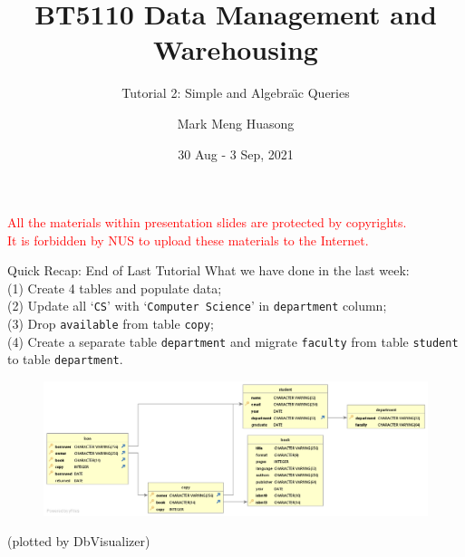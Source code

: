 \title{BT5110 Data Management and Warehousing}

\subtitle{Tutorial 2: Simple and Algebra\"{\i}c Queries}

\author{Mark Meng Huasong}



\date{30 Aug - 3 Sep, 2021}

\begin{frame}
	\titlepage
	\begin{tcolorbox}
		\begin{center}
			{\scriptsize \textcolor{red}{All the materials within presentation slides are protected by copyrights.\\
					It is forbidden by NUS to upload these materials to the Internet.}}
		\end{center}
	\end{tcolorbox}
\end{frame}

\begin{frame}[fragile]{Quick Recap: End of Last Tutorial}
	What we have done in the last week:\\\vspace{5pt}
	(1) Create 4 tables and populate data;\\
	(2) Update all `\texttt{CS}' with `\texttt{Computer Science}' in \texttt{department} column;\\
	(3) Drop \texttt{available} from table \texttt{copy};\\
	(4) Create a separate table \texttt{department} and migrate \texttt{faculty} from table \texttt{student} to table \texttt{department}. 
	\begin{figure}
		\includegraphics[width=1\textwidth]{t1/images/t1-end.png}
	\end{figure}
	(plotted by DbVisualizer)
\end{frame}


